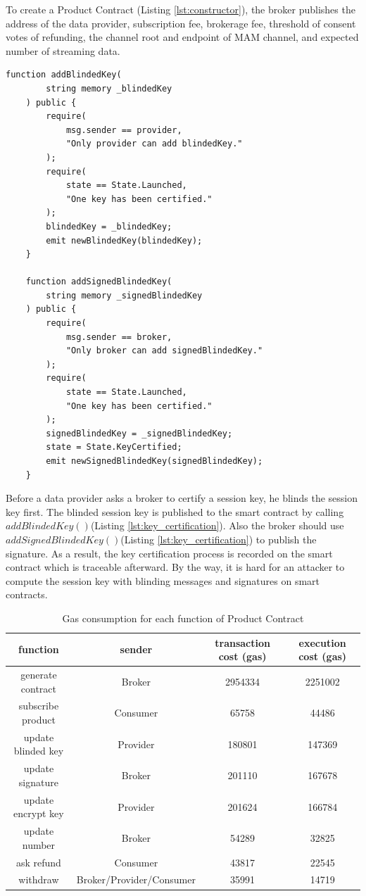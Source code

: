 \documentclass[journal,article,applsci,submit,moreauthors,pdftex]{Definitions/mdpi}
\begin{document}
To create a Product Contract (Listing \ref{lst:constructor}), the broker publishes the address of the data provider, subscription fee, brokerage fee, threshold of consent votes of refunding, the channel root and endpoint of MAM channel, and expected number of streaming data.

\begin{lstlisting}[caption={update blinded key and update signature}, label={lst:key_certification}, frame=single]
	function addBlindedKey(
		string memory _blindedKey
	) public {
		require(
			msg.sender == provider,
			"Only provider can add blindedKey."
		);
		require(
			state == State.Launched,
			"One key has been certified."
		);
		blindedKey = _blindedKey;
		emit newBlindedKey(blindedKey);
	}
	
	function addSignedBlindedKey(
		string memory _signedBlindedKey
	) public {
		require(
			msg.sender == broker,
			"Only broker can add signedBlindedKey."
		);
		require(
			state == State.Launched,
			"One key has been certified."
		);
		signedBlindedKey = _signedBlindedKey;
		state = State.KeyCertified;
		emit newSignedBlindedKey(signedBlindedKey);
	}
\end{lstlisting}

Before a data provider asks a broker to certify a session key, he blinds the session key first. The blinded session key is published to the smart contract by calling $addBlindedKey()$(Listing \ref{lst:key_certification}). Also the broker should use $addSignedBlindedKey()$(Listing \ref{lst:key_certification}) to publish the signature. As a result, the key certification process is recorded on the smart contract which is traceable afterward. By the way, it is hard for an attacker to compute the session key with blinding messages and signatures on smart contracts.

\begin{table}[H]
	\caption{Gas consumption for each function of Product Contract}
	\centering
	\label{tab:gas}
	\begin{tabular}{cccc}
		\toprule
		\textbf{function} & \textbf{sender} & \textbf{transaction cost (gas)} & \textbf{execution cost (gas)} \\
		\midrule
		generate contract & Broker & 2954334 & 2251002 \\
		subscribe product & Consumer & 65758 & 44486 \\
		update blinded key & Provider & 180801 & 147369 \\
		update signature & Broker & 201110 & 167678 \\
		update encrypt key & Provider & 201624 & 166784 \\
		update number & Broker & 54289 & 32825 \\
		ask refund & Consumer & 43817 & 22545 \\
		withdraw & Broker/Provider/Consumer & 35991 & 14719 \\
		\bottomrule
	\end{tabular}
\end{table}
\end{document}
